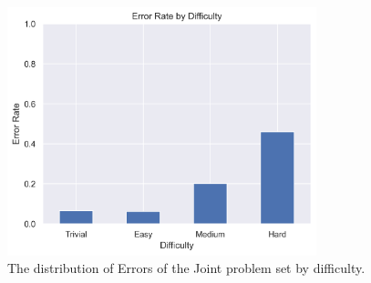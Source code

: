 \begin{figure}[ht]
  \centering
  \includegraphics[width=0.8\textwidth]{figures/Data/dist_joints/Error_Rate_by_Difficulty.png}
  \caption[Error Distribution of the joints by difficulty]{The distribution of Errors of the Joint problem set by difficulty.}
  \label{fig:jt_diff_dist}
\end{figure}

